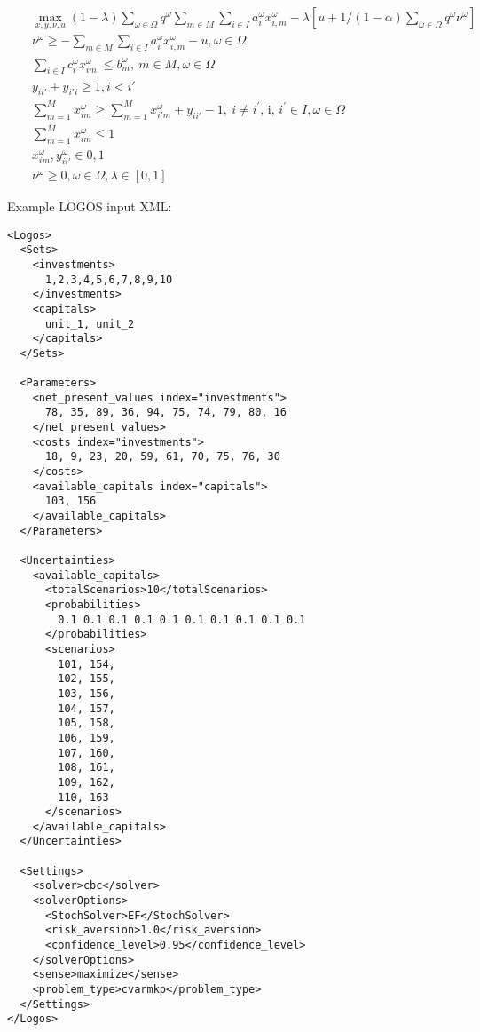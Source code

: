 \vst {}
\begin{subequations}\label{CVaRMKP}
\begin{eqnarray}
& & \max_{x, y, \nu, u} (1-\lambda)  \sum _{ \omega  \in  \Omega }^{}q^{ \omega } \sum_{m\in M} \sum _{i \in I}^{} a_{i}^{ \omega }x_{i, m}^{ \omega } - \lambda[u+1/(1-\alpha)\sum_{\omega \in \Omega} q^\omega \nu^\omega] \\
& & \nu^\omega \ge - \sum_{m\in M} \sum _{i \in I}^{} a_{i}^{ \omega }x_{i, m}^{ \omega } - u, \omega \in \Omega \\
& & \sum _{i \in I}^{} c_{i}^{ \omega }x_{im}^{ \omega }~  \leq  b_{m}^{ \omega },~ m \in M,  \omega  \in  \Omega \\
& & y_{ii'} + y_{i'i} \geq 1, i<i'  \\
& & \sum_{m=1}^{M} x_{im}^\omega \geq \sum_{m=1}^{M} x_{i'm}^\omega + y_{ii'} -1,~ i \neq i^{'}\text{, i, }i^{'} \in I,  \omega  \in  \Omega \\
& & \sum_{m=1}^{M} x_{im}^\omega \leq 1 \\
& & x_{im}^\omega, y_{ii'}^\omega \in {0, 1} \\
& & \nu^\omega \ge 0, \omega \in \Omega, \lambda \in [0, 1]
\end{eqnarray}
\end{subequations}

Example LOGOS input XML:
\begin{lstlisting}[style=XML]
<Logos>
  <Sets>
    <investments>
      1,2,3,4,5,6,7,8,9,10
    </investments>
    <capitals>
      unit_1, unit_2
    </capitals>
  </Sets>

  <Parameters>
    <net_present_values index="investments">
      78, 35, 89, 36, 94, 75, 74, 79, 80, 16
    </net_present_values>
    <costs index="investments">
      18, 9, 23, 20, 59, 61, 70, 75, 76, 30
    </costs>
    <available_capitals index="capitals">
      103, 156
    </available_capitals>
  </Parameters>

  <Uncertainties>
    <available_capitals>
      <totalScenarios>10</totalScenarios>
      <probabilities>
        0.1 0.1 0.1 0.1 0.1 0.1 0.1 0.1 0.1 0.1
      </probabilities>
      <scenarios>
        101, 154,
        102, 155,
        103, 156,
        104, 157,
        105, 158,
        106, 159,
        107, 160,
        108, 161,
        109, 162,
        110, 163
      </scenarios>
    </available_capitals>
  </Uncertainties>

  <Settings>
    <solver>cbc</solver>
    <solverOptions>
      <StochSolver>EF</StochSolver>
      <risk_aversion>1.0</risk_aversion>
      <confidence_level>0.95</confidence_level>
    </solverOptions>
    <sense>maximize</sense>
    <problem_type>cvarmkp</problem_type>
  </Settings>
</Logos>
\end{lstlisting}


